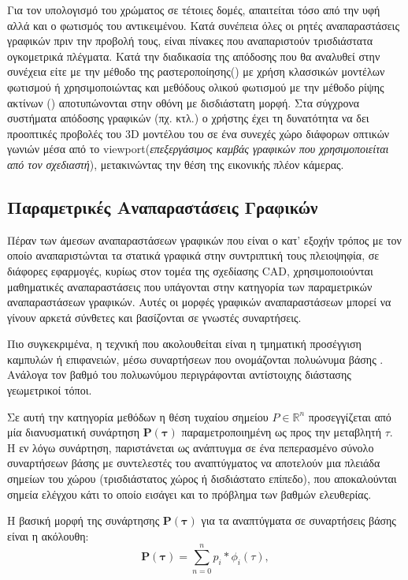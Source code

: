     Για τον υπολογισμό του χρώματος σε τέτοιες δομές, απαιτείται τόσο από την υφή αλλά και ο φωτισμός του αντικειμένου. Κατά συνέπεια όλες οι ρητές αναπαραστάσεις γραφικών πριν την προβολή τους, είναι πίνακες που αναπαριστούν τρισδιάστατα ογκομετρικά πλέγματα. Κατά την διαδικασία της απόδοσης που θα αναλυθεί στην συνέχεια είτε με την μέθοδο της ραστεροποίησης() με χρήση κλασσικών μοντέλων φωτισμού ή χρησιμοποιώντας και μεθόδους ολικού φωτισμού με την μέθοδο ρίψης ακτίνων () αποτυπώνονται στην οθόνη με δισδιάστατη μορφή. Στα σύγχρονα συστήματα απόδοσης γραφικών (πχ.  κτλ.) ο χρήστης έχει τη δυνατότητα να δει προοπτικές προβολές του 3D μοντέλου του σε ένα συνεχές χώρο διάφορων οπτικών γωνιών μέσα από το viewport(\textit{επεξεργάσιμος καμβάς γραφικών που χρησιμοποιείται από τον σχεδιαστή}), μετακινώντας την θέση της εικονικής πλέον κάμερας. 


\subsection{Παραμετρικές Αναπαραστάσεις Γραφικών}
\par
    Πέραν των άμεσων αναπαραστάσεων γραφικών που είναι ο κατ' εξοχήν τρόπος με τον οποίο αναπαριστώνται τα στατικά γραφικά στην συντριπτική τους πλειοψηφία, σε διάφορες εφαρμογές, κυρίως στον τομέα της σχεδίασης CAD, χρησιμοποιούνται μαθηματικές αναπαραστάσεις που υπάγονται στην κατηγορία των παραμετρικών αναπαραστάσεων γραφικών. Αυτές οι μορφές γραφικών αναπαραστάσεων μπορεί να γίνουν αρκετά σύνθετες και βασίζονται σε γνωστές συναρτήσεις.

    Πιο συγκεκριμένα, η τεχνική που ακολουθείται είναι η τμηματική προσέγγιση καμπυλών ή επιφανειών, μέσω συναρτήσεων που ονομάζονται πολυώνυμα βάσης \cite{winkel2001generalized}. Ανάλογα τον βαθμό του πολυωνύμου περιγράφονται αντίστοιχης διάστασης γεωμετρικοί τόποι. 

    Σε αυτή την κατηγορία μεθόδων η θέση τυχαίου σημείου $P \in \mathbb{R}^{n}$  προσεγγίζεται από μία διανυσματική συνάρτηση $\mathbf{P(\tau)}$ παραμετροποιημένη ως προς την μεταβλητή $\tau$. Η εν λόγω συνάρτηση, παριστάνεται ως ανάπτυγμα σε ένα πεπερασμένο σύνολο συναρτήσεων βάσης με συντελεστές του αναπτύγματος να αποτελούν μια πλειάδα σημείων του χώρου (τρισδιάστατος χώρος ή δισδιάστατο επίπεδο), που αποκαλούνται σημεία ελέγχου κάτι το οποίο εισάγει και το πρόβλημα των βαθμών ελευθερίας.

    Η βασική μορφή της συνάρτησης $\mathbf{P(\tau)}$ για τα αναπτύγματα σε συναρτήσεις βάσης είναι η ακόλουθη:
    \begin{equation}
        \mathbf{P(\tau)} = \sum_{n=0}^{n} p_i*\phi_i(\tau),
        \label{eq:PolynomialBaseSeries}
    \end{equation}
    
